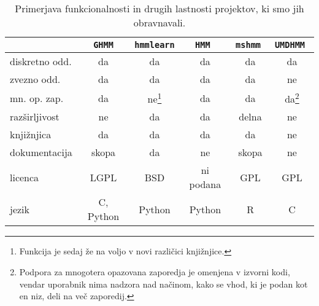 \begin{table}
\begin{minipage}{\textwidth}
\centering
\small
\begin{tabular}{l|c|c|c|c|c}
& {\tt GHMM} & {\tt hmmlearn} & \tt{HMM} & \tt{mshmm} & \tt{UMDHMM} \\ \hline
diskretno odd. & da & da & da & da & da \\ 
zvezno odd.    & da & da & da & da & ne \\
mn. op. zap.   & da & ne\footnote{Funkcija je sedaj že na voljo v novi različici knjižnjice.}
                        & da & da & da\footnote{Podpora za mnogotera opazovana zaporedja je omenjena v izvorni kodi, vendar uporabnik nima nadzora nad načinom, kako se vhod, ki je podan kot en niz, deli na več zaporedij.} \\
razširljivost  & ne & da & da & delna & ne \\
knjižnjica  & da & da & da & da & ne \\
dokumentacija  & skopa & da & ne & skopa & ne \\
licenca        & LGPL & BSD & ni podana & GPL & GPL \\
jezik          & C, Python & Python & Python & R & C \\
\end{tabular}
\caption[Pirmerjava funkcionalnosti projektov]{
  Primerjava funkcionalnosti in drugih lastnosti projektov, ki smo jih
  obravnavali.}
\label{tab:compare}
\end{minipage}
\end{table}
